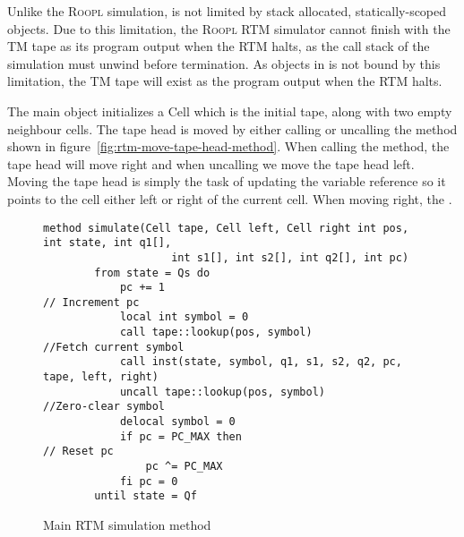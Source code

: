 Unlike the \textsc{Roopl} simulation, \rooplpp is not limited by stack allocated, statically-scoped objects. Due to this limitation, the \textsc{Roopl} RTM simulator cannot finish with the TM tape as its program output when the RTM halts, as the call stack of the simulation must unwind before termination. As objects in \rooplpp is not bound by this limitation, the TM tape will exist as the program output when the RTM halts.

The main object initializes a Cell which is the initial tape, along with two empty neighbour cells. The tape head is moved by either calling or uncalling the method shown in figure~\ref{fig:rtm-move-tape-head-method}. When calling the method, the tape head will move right and when uncalling we move the tape head left. Moving the tape head is simply the task of updating the variable reference so it points to the cell either left or right of the current cell. When moving right, the . 

\begin{figure}[ht]
    \centering
    \begin{lstlisting}[style = basic, language = roopl]
    method simulate(Cell tape, Cell left, Cell right int pos, int state, int q1[], 
                    int s1[], int s2[], int q2[], int pc)
        from state = Qs do 
            pc += 1                                         // Increment pc
            local int symbol = 0
            call tape::lookup(pos, symbol)                  //Fetch current symbol
            call inst(state, symbol, q1, s1, s2, q2, pc, tape, left, right)
            uncall tape::lookup(pos, symbol)                //Zero-clear symbol    
            delocal symbol = 0
            if pc = PC_MAX then                             // Reset pc
                pc ^= PC_MAX
            fi pc = 0
        until state = Qf
    \end{lstlisting}
    \caption{Main RTM simulation method}
    \label{fig:rtm-simulation-method}
\end{figure} 

